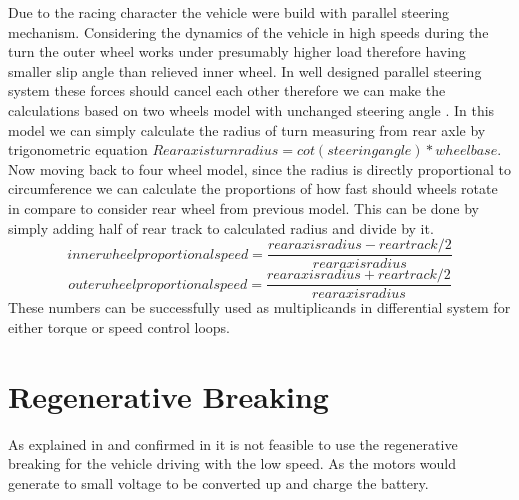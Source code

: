 Due to the racing character the vehicle were build with parallel steering mechanism. Considering the dynamics of the vehicle in high speeds during the turn the outer wheel works under presumably higher load therefore having smaller slip angle than relieved inner wheel. In well designed parallel steering system these forces should cancel each other therefore we can make the calculations based on two wheels model with unchanged steering angle .
In this model we can simply calculate the radius of turn measuring from rear axle by trigonometric equation $Rear axis turn radius = cot( steering angle ) * wheelbase$. Now moving back to four wheel model, since the radius is directly proportional to circumference we can calculate the proportions of how fast should wheels rotate in compare to consider rear wheel from previous model. This can be done by simply adding half of rear track to calculated radius and divide by it.
\begin{equation}
    inner wheel proportional speed = \frac{rear axis radius - rear track / 2}{rear axis radius}
\end{equation}
\begin{equation}
    outer wheel proportional speed = \frac{rear axis radius + rear track / 2}{rear axis radius}
\end{equation}
These numbers can be successfully used as multiplicands in differential system for either torque or speed control loops.

\section{Regenerative Breaking} \label{regenerative_theory_section}

As explained in \cite{low_speed_regenerative_breaking} and confirmed in \cite{regen_strategy} it is not feasible to use the regenerative breaking for the vehicle driving with the low speed. As the motors would generate to small voltage to be converted up and charge the battery.